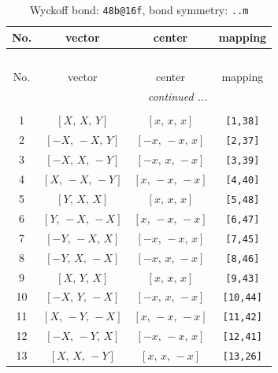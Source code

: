 \documentclass[fleqn,8pt]{jsarticle}
\begin{document}
\begin{longtable}{cccc}
\caption{Wyckoff bond: {\tt 48b@16f}, bond symmetry: {\tt ..m}}
 \\
 \hline \hline
No. & vector & center & mapping \\ \hline \endfirsthead

\multicolumn{3}{l}{\tablename\ \thetable{}} \\
 \hline \hline
No. & vector & center & mapping \\ \hline \endhead

 \hline \hline
\multicolumn{3}{r}{\footnotesize\it continued ...} \\ \endfoot

 \hline \hline
\multicolumn{3}{r}{} \\ \endlastfoot

1 & $\left[ X,\, X,\, Y \right]$ & $\left[ x,\, x,\, x \right]$ & {\tt [1,38]} \\ \hline
2 & $\left[ - X,\, - X,\, Y \right]$ & $\left[ - x,\, - x,\, x \right]$ & {\tt [2,37]} \\ \hline
3 & $\left[ - X,\, X,\, - Y \right]$ & $\left[ - x,\, x,\, - x \right]$ & {\tt [3,39]} \\ \hline
4 & $\left[ X,\, - X,\, - Y \right]$ & $\left[ x,\, - x,\, - x \right]$ & {\tt [4,40]} \\ \hline
5 & $\left[ Y,\, X,\, X \right]$ & $\left[ x,\, x,\, x \right]$ & {\tt [5,48]} \\ \hline
6 & $\left[ Y,\, - X,\, - X \right]$ & $\left[ x,\, - x,\, - x \right]$ & {\tt [6,47]} \\ \hline
7 & $\left[ - Y,\, - X,\, X \right]$ & $\left[ - x,\, - x,\, x \right]$ & {\tt [7,45]} \\ \hline
8 & $\left[ - Y,\, X,\, - X \right]$ & $\left[ - x,\, x,\, - x \right]$ & {\tt [8,46]} \\ \hline
9 & $\left[ X,\, Y,\, X \right]$ & $\left[ x,\, x,\, x \right]$ & {\tt [9,43]} \\ \hline
10 & $\left[ - X,\, Y,\, - X \right]$ & $\left[ - x,\, x,\, - x \right]$ & {\tt [10,44]} \\ \hline
11 & $\left[ X,\, - Y,\, - X \right]$ & $\left[ x,\, - x,\, - x \right]$ & {\tt [11,42]} \\ \hline
12 & $\left[ - X,\, - Y,\, X \right]$ & $\left[ - x,\, - x,\, x \right]$ & {\tt [12,41]} \\ \hline
13 & $\left[ X,\, X,\, - Y \right]$ & $\left[ x,\, x,\, - x \right]$ & {\tt [13,26]} \\ \hline

\end{longtable}
\end{document}
